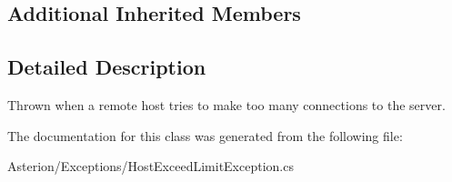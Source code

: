 \subsection*{Additional Inherited Members}


\subsection{Detailed Description}
Thrown when a remote host tries to make too many connections to the server. 

The documentation for this class was generated from the following file\-:\begin{DoxyCompactItemize}
\item 
Asterion/\-Exceptions/Host\-Exceed\-Limit\-Exception.\-cs\end{DoxyCompactItemize}
